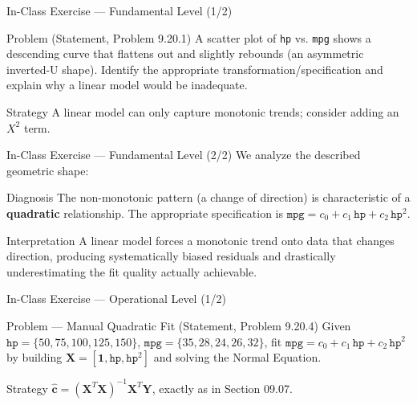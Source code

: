 \documentclass[10pt, aspectratio=169]{beamer}
\begin{document}
\begin{frame}{In-Class Exercise --- Fundamental Level (1/2)}
  \footnotesize
  \begin{block}{Problem (Statement, Problem 9.20.1)}
    A scatter plot of \texttt{hp} vs. \texttt{mpg} shows a descending curve that flattens out and slightly rebounds (an asymmetric inverted-U shape). Identify the appropriate transformation/specification and explain why a linear model would be inadequate.
  \end{block}

  \vspace{0.15cm}
  \pause
  \begin{alertblock}{Strategy}
    A linear model can only capture monotonic trends; consider adding an $X^2$ term.
  \end{alertblock}
\end{frame}

\begin{frame}{In-Class Exercise --- Fundamental Level (2/2)}
  \scriptsize
  We analyze the described geometric shape: \pause

  \vspace{0.05cm}
  \begin{block}{Diagnosis}
    The non-monotonic pattern (a change of direction) is characteristic of a \textbf{quadratic} relationship. The appropriate specification is $\texttt{mpg}=c_0+c_1\,\texttt{hp}+c_2\,\texttt{hp}^2$.
  \end{block}

  \vspace{0.05cm}
  \pause
  \begin{alertblock}{Interpretation}
    A linear model forces a monotonic trend onto data that changes direction, producing systematically biased residuals and drastically underestimating the fit quality actually achievable.
  \end{alertblock}
\end{frame}

\begin{frame}{In-Class Exercise --- Operational Level (1/2)}
  \footnotesize
  \begin{block}{Problem --- Manual Quadratic Fit (Statement, Problem 9.20.4)}
    Given $\texttt{hp}=\{50,75,100,125,150\}$, $\texttt{mpg}=\{35,28,24,26,32\}$, fit $\texttt{mpg}=c_0+c_1\,\texttt{hp}+c_2\,\texttt{hp}^2$ by building $\mathbf{X}=[\mathbf{1},\texttt{hp},\texttt{hp}^2]$ and solving the Normal Equation.
  \end{block}

  \vspace{0.1cm}
  \pause
  \begin{alertblock}{Strategy}
    $\hat{\mathbf{c}}=(\mathbf{X}^T\mathbf{X})^{-1}\mathbf{X}^T\mathbf{Y}$, exactly as in Section 09.07.
  \end{alertblock}
\end{frame}
\end{document}
